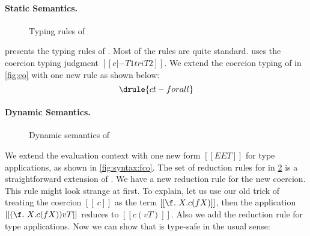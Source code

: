 \paragraph{\tnamee Static Semantics.}

\begin{figure}
  \centering
  \caption{Typing rules of \tnamee}
  \label{fig:typing:fco}
\end{figure}

 presents the typing rules of \tnamee. Most of the rules
are quite standard.  uses the coercion typing judgment $[[ c |- T1 tri T2 ]]$.
We extend the coercion typing of \tname in \cref{fig:co} with one new rule
 as shown below:
\[
  \drule{ct-forall}
\]


\paragraph{\tnamee Dynamic Semantics.}


\begin{figure}[t]
  \centering
  \caption{Dynamic semantics of \tnamee}
  \label{fig:red:fi}
\end{figure}


We extend the evaluation context with one new form $[[EE T]]$ for type
applications, as shown in \cref{fig:syntax:fco}. The set of reduction rules for \tnamee in \cref{fig:red:fi}
is a straightforward extension of \tname. We
have a new reduction rule  for the new coercion. This rule might look
strange at first. To explain, let us use our old trick of treating the coercion
$[[\ c]]$ as the term $[[ \f . \ X . c (f X) ]]$, then the application
$[[(\f . \ X . c (f X)) v T ]]$ reduces to $[[ c (v T) ]]$. Also we add the
reduction rule  for type applications. Now we can show that
\tnamee is type-safe in the usual sense:

